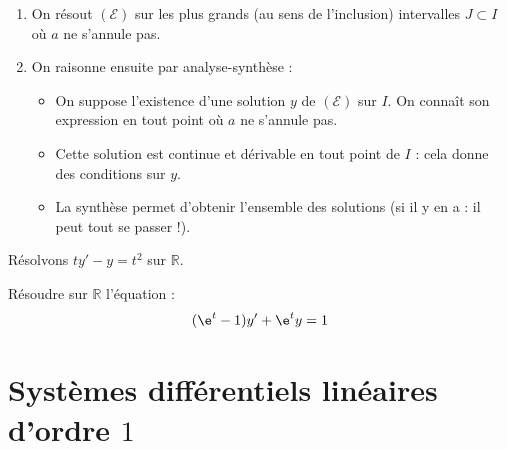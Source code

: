 \documentclass[french,11pt,twoside]{VcCours}
\begin{document}
\begin{enumerate}
\item On résout $(\mathcal{E})$ sur les plus grands (au sens de l'inclusion) intervalles $J \subset I$ où $a$ ne s'annule pas.
\item On raisonne ensuite par analyse-synthèse : 
\begin{itemize}
\item On suppose l'existence d'une solution $y$ de $(\mathcal{E})$ sur $I$. On connaît son expression en tout point où $a$ ne s'annule pas.
\item Cette solution est continue et dérivable en tout point de $I$ : cela donne des conditions sur $y$.
\item La synthèse permet d'obtenir l'ensemble des solutions (si il y en a : il peut tout se passer !).
\end{itemize}
\end{enumerate}



\begin{Exemple} Résolvons $ty'-y=t^2$ sur $\mathbb{R}$.
\vspace*{10cm}
\end{Exemple}

\phantom{test}

\vspace*{4cm}
\begin{ApplicationDirecte}{}Résoudre sur $\mathbb{R}$ l'équation :
  \[
  (\e^{t} - 1)y' + \e^{t} y = 1
  \]
\end{ApplicationDirecte}

\section{Systèmes différentiels linéaires d'ordre \texorpdfstring{$1$}{1}}
\end{document}
